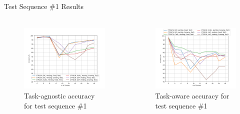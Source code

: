 \documentclass[aspectratio=169, xcolor=dvipsnames]{beamer}
\begin{document}
\begin{frame}{Test Sequence \#1 Results}
      \framesubtitle{}%
      
      \begin{columns}
      \begin{figure}[ht!]
            \centering
            \includegraphics[width=\textwidth]{images/test_seq1_TAw_Acc.png}
            \caption{Task-agnostic accuracy for test sequence \#1}
      \end{figure}
      
      \begin{figure}[ht!]
            \centering
            \includegraphics[width=\textwidth]{images/test_seq1_TAg_Acc.png}
            \caption{Task-aware accuracy for test sequence \#1}
      \end{figure} 
      \end{columns}
\end{frame}
\end{document}
